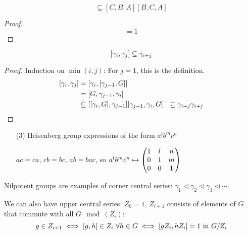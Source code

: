 \documentclass[a4paper,twoside,master.tex]{subfiles}
\begin{document}

\begin{claim}
    \begin{equation}
        [A,B,C] \subseteq [C,B,A][B,C,A]
    \end{equation}
\end{claim}
\begin{proof}
    \begin{equation}
        [a,b,c^a][c,a,b^c][b,c,a^b] = 1
    \end{equation}
\end{proof}

\begin{claim}
    \begin{equation}
        \comm{\gamma_i}{\gamma_j} \subseteq \gamma_{i+j}
    \end{equation}
\end{claim}
\begin{proof}
    Induction on $ \min(i,j) $: For $ j = 1 $, this is the definition.
    \begin{align}
        \comm{\gamma_i}{\gamma_j} &= \comm{\gamma_i}{\comm{\gamma_{j-1}}{G}}\\
        &= [G, \gamma_{j-1}, \gamma_{i}]\\
        &\subseteq \comm{\comm{\gamma_i}{G}}{\gamma_{j-1}} [\gamma_{j-1}, \gamma_{i}, G]
        &\subseteq \gamma_{i+j} \gamma_{i+j}
    \end{align}
\end{proof}

\begin{itemize}
    \item[(3)] Heisenberg group expressions of the form $ a^l b^m c^n $

        $ ac = ca $, $ c b = b c $, $ ab = bac $, so $ a^l b^m c^n \mapsto \mqty(1&l&n\\0&1&m\\0&0&1) $
\end{itemize}

Nilpotent groups are examples of corner central series: $ \gamma_1 \triangleleft \gamma_2 \triangleleft \gamma_3 \triangleleft \cdots $.

We can also have upper central series: $ Z_0 = 1 $, $ Z_{i + 1} $ consists of elements of $ G $ that commute with all $ G \mod(Z_i) $:
\begin{equation}
    g \in Z_{i+1} \iff \comm{g}{h} \in Z_i\ \forall h \in G \iff \comm{g Z_i}{h Z_i} = 1 \text{ in } G/Z_i
\end{equation}
\end{document}
